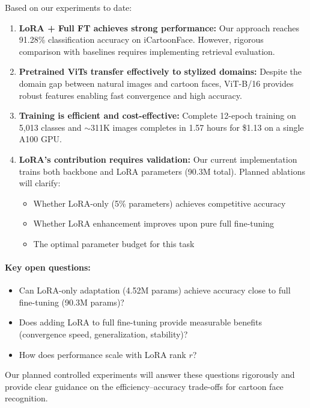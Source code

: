\documentclass[11pt]{article}
\begin{document}
Based on our experiments to date:

\begin{enumerate}
    \item \textbf{LoRA + Full FT achieves strong performance:} Our approach reaches 91.28\% classification accuracy on iCartoonFace. However, rigorous comparison with baselines requires implementing retrieval evaluation.

    \item \textbf{Pretrained ViTs transfer effectively to stylized domains:} Despite the domain gap between natural images and cartoon faces, ViT-B/16 provides robust features enabling fast convergence and high accuracy.

    \item \textbf{Training is efficient and cost-effective:} Complete 12-epoch training on 5,013 classes and $\sim$311K images completes in 1.57 hours for \$1.13 on a single A100 GPU.

    \item \textbf{LoRA's contribution requires validation:} Our current implementation trains both backbone and LoRA parameters (90.3M total). Planned ablations will clarify:
    \begin{itemize}
        \item Whether LoRA-only (5\% parameters) achieves competitive accuracy
        \item Whether LoRA enhancement improves upon pure full fine-tuning
        \item The optimal parameter budget for this task
    \end{itemize}
\end{enumerate}

\paragraph{Key open questions:}
\begin{itemize}
    \item Can LoRA-only adaptation (4.52M params) achieve accuracy close to full fine-tuning (90.3M params)?
    \item Does adding LoRA to full fine-tuning provide measurable benefits (convergence speed, generalization, stability)?
    \item How does performance scale with LoRA rank $r$?
\end{itemize}

Our planned controlled experiments will answer these questions rigorously and provide clear guidance on the efficiency--accuracy trade-offs for cartoon face recognition.
\end{document}
